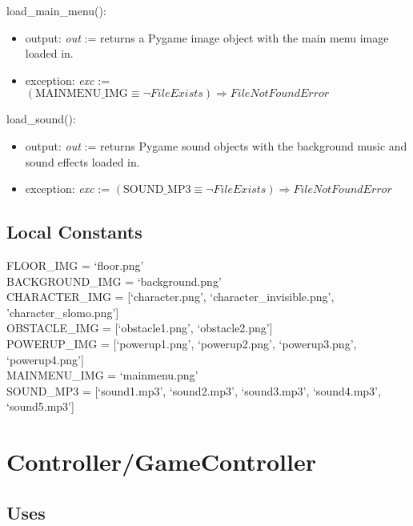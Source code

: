 \documentclass[12pt]{article}
\begin{document}
\noindent load\_main\_menu():
\begin{itemize}
    \item output: \textit{out} := returns a Pygame image object with the main menu image loaded in.
    \item exception: \textit{exc} := $(\text{MAINMENU\_IMG} \equiv \neg FileExists) \Rightarrow FileNotFoundError$
\end{itemize}

\noindent load\_sound():
\begin{itemize}
    \item output: \textit{out} := returns Pygame sound objects with the background music and sound effects loaded in.
    \item exception: \textit{exc} := $(\text{SOUND\_MP3} \equiv \neg FileExists) \Rightarrow FileNotFoundError$
\end{itemize}
\subsection*{Local Constants}
FLOOR\_IMG = `floor.png' \\
BACKGROUND\_IMG = `background.png' \\
CHARACTER\_IMG = [`character.png', `character\_invisible.png', 'character\_slomo.png']\\
OBSTACLE\_IMG = [`obstacle1.png', `obstacle2.png']\\
POWERUP\_IMG = [`powerup1.png', `powerup2.png', `powerup3.png', `powerup4.png']\\
MAINMENU\_IMG = `mainmenu.png'\\ 
SOUND\_MP3 = [`sound1.mp3', `sound2.mp3', `sound3.mp3', `sound4.mp3', `sound5.mp3']\\

\medskip

\newpage
\section*{Controller/GameController}

\subsection* {Uses}
\end{document}
